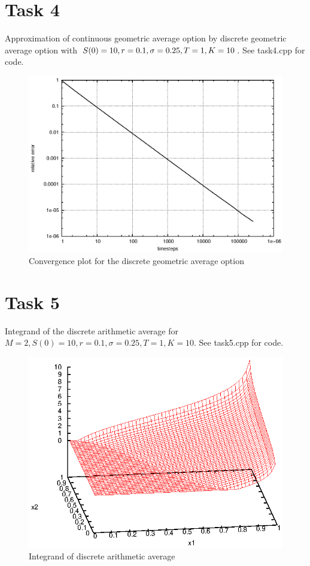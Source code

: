 \documentclass[]{article}
\begin{document}
\section*{Task 4} Approximation of continuous geometric average option by discrete geometric average option with $S(0)=10,r=0.1,\\\sigma=0.25,T=1,K=10$. See task4.cpp for code.
\begin{figure}[!ht]
\centering
\includegraphics[width=.9\textwidth]{task4.eps}
\caption{Convergence plot for the discrete geometric average option}
\label{fig:Task4}
\end{figure}
\clearpage

\section*{Task 5} Integrand of the discrete arithmetic average for $M=2,S(0)=10,r=0.1,\sigma=0.25,T=1,K=10$. See task5.cpp for code.\\
\begin{figure}[!ht]
\centering
\includegraphics[width=.9\textwidth]{task5_1}
\caption{Integrand of discrete arithmetic average}
\label{fig:Task5}
\end{figure}
\end{document}
